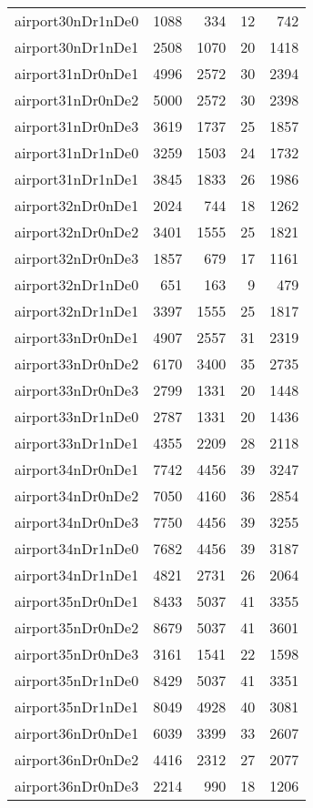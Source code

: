 \documentclass[../../../thesis.tex]{subfiles}
\begin{document}
\begin{longtable}{lrrrr}
airport30nDr1nDe0 & 1088 & 334 & 12 & 742 \\
airport30nDr1nDe1 & 2508 & 1070 & 20 & 1418 \\
airport31nDr0nDe1 & 4996 & 2572 & 30 & 2394 \\
airport31nDr0nDe2 & 5000 & 2572 & 30 & 2398 \\
airport31nDr0nDe3 & 3619 & 1737 & 25 & 1857 \\
airport31nDr1nDe0 & 3259 & 1503 & 24 & 1732 \\
airport31nDr1nDe1 & 3845 & 1833 & 26 & 1986 \\
airport32nDr0nDe1 & 2024 & 744 & 18 & 1262 \\
airport32nDr0nDe2 & 3401 & 1555 & 25 & 1821 \\
airport32nDr0nDe3 & 1857 & 679 & 17 & 1161 \\
airport32nDr1nDe0 & 651 & 163 & 9 & 479 \\
airport32nDr1nDe1 & 3397 & 1555 & 25 & 1817 \\
airport33nDr0nDe1 & 4907 & 2557 & 31 & 2319 \\
airport33nDr0nDe2 & 6170 & 3400 & 35 & 2735 \\
airport33nDr0nDe3 & 2799 & 1331 & 20 & 1448 \\
airport33nDr1nDe0 & 2787 & 1331 & 20 & 1436 \\
airport33nDr1nDe1 & 4355 & 2209 & 28 & 2118 \\
airport34nDr0nDe1 & 7742 & 4456 & 39 & 3247 \\
airport34nDr0nDe2 & 7050 & 4160 & 36 & 2854 \\
airport34nDr0nDe3 & 7750 & 4456 & 39 & 3255 \\
airport34nDr1nDe0 & 7682 & 4456 & 39 & 3187 \\
airport34nDr1nDe1 & 4821 & 2731 & 26 & 2064 \\
airport35nDr0nDe1 & 8433 & 5037 & 41 & 3355 \\
airport35nDr0nDe2 & 8679 & 5037 & 41 & 3601 \\
airport35nDr0nDe3 & 3161 & 1541 & 22 & 1598 \\
airport35nDr1nDe0 & 8429 & 5037 & 41 & 3351 \\
airport35nDr1nDe1 & 8049 & 4928 & 40 & 3081 \\
airport36nDr0nDe1 & 6039 & 3399 & 33 & 2607 \\
airport36nDr0nDe2 & 4416 & 2312 & 27 & 2077 \\
airport36nDr0nDe3 & 2214 & 990 & 18 & 1206 \\

\end{longtable}
\end{document}

